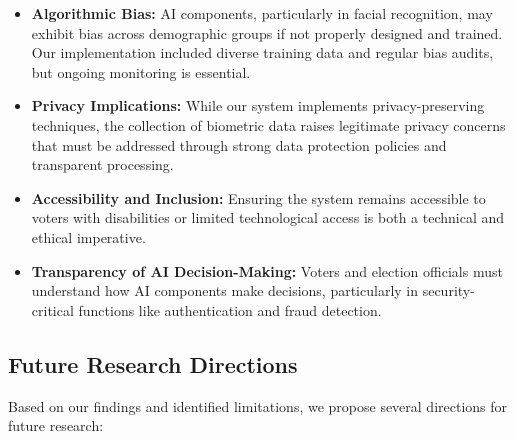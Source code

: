 \documentclass[conference]{IEEEtran}
\begin{document}
\begin{itemize}
    \item \textbf{Algorithmic Bias:} AI components, particularly in facial recognition, may exhibit bias across demographic groups if not properly designed and trained. Our implementation included diverse training data and regular bias audits, but ongoing monitoring is essential.
    
    \item \textbf{Privacy Implications:} While our system implements privacy-preserving techniques, the collection of biometric data raises legitimate privacy concerns that must be addressed through strong data protection policies and transparent processing.
    
    \item \textbf{Accessibility and Inclusion:} Ensuring the system remains accessible to voters with disabilities or limited technological access is both a technical and ethical imperative.
    
    \item \textbf{Transparency of AI Decision-Making:} Voters and election officials must understand how AI components make decisions, particularly in security-critical functions like authentication and fraud detection.
\end{itemize}

\subsection{Future Research Directions}
Based on our findings and identified limitations, we propose several directions for future research:
\end{document}
